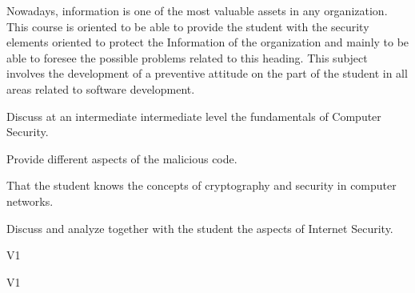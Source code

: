 \begin{syllabus}


\begin{justification}
Nowadays, information is one of the most valuable assets in any organization. This course is oriented to be able to provide the student with the security elements oriented to protect the
Information of the organization and mainly to be able to foresee the possible problems related to this heading.
This subject involves the development of a preventive attitude on the part of the student in all areas related to software development.
\end{justification}

\begin{goals}
\item Discuss at an intermediate intermediate level the fundamentals of Computer Security.
\item Provide different aspects of the malicious code.
\item That the student knows the concepts of cryptography and security in computer networks.
\item Discuss and analyze together with the student the aspects of Internet Security.
\end{goals}


\begin{outcomes}{V1}
    \item {}
    \item {}
    \item {}
    \item {}
    \item {}
    \item {}
    \item {}
\end{outcomes}


\begin{competences}{V1}
    \item {}
    \item {}
    \item {}
    \item {}
    \item {}
    \item {}
    \item {}
\end{competences}




\end{syllabus}
